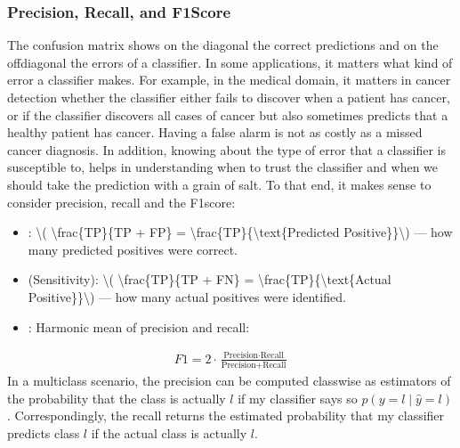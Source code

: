 \documentclass[letterpaper,10pt,english]{jupyterBook}
\begin{document}
\subsubsection{Precision, Recall, and F1\sphinxhyphen{}Score}
\label{\detokenize{classification_evaluation:precision-recall-and-f1-score}}
\sphinxAtStartPar
The confusion matrix shows on the diagonal the correct predictions and on the off\sphinxhyphen{}diagonal the errors of a classifier. In some applications, it matters what kind of error a classifier makes. For example, in the medical domain, it matters in cancer detection whether the classifier either fails to discover when a patient has cancer, or if the classifier discovers all cases of cancer but also sometimes predicts that a healthy patient has cancer. Having a false alarm is not as costly as a missed cancer diagnosis. In addition, knowing about the type of error that a classifier is susceptible to, helps in understanding when to trust the classifier and when we should take the prediction with a grain of salt. To that end, it makes sense to consider precision, recall and the F1\sphinxhyphen{}score:
\begin{itemize}
\item {} 
\sphinxAtStartPar
{}: \textbackslash{}( \textbackslash{}frac\{TP\}\{TP + FP\}  = \textbackslash{}frac\{TP\}\{\textbackslash{}text\{Predicted Positive\}\}\textbackslash{}) — how many predicted positives were correct.

\item {} 
\sphinxAtStartPar
{} (Sensitivity): \textbackslash{}( \textbackslash{}frac\{TP\}\{TP + FN\}  = \textbackslash{}frac\{TP\}\{\textbackslash{}text\{Actual Positive\}\}\textbackslash{}) — how many actual positives were identified.

\item {} 
\sphinxAtStartPar
{}: Harmonic mean of precision and recall:

\end{itemize}
\begin{equation*}
\begin{split}
F1 = 2 \cdot \frac{\text{Precision} \cdot \text{Recall}}{\text{Precision} + \text{Recall}}
\end{split}
\end{equation*}
\sphinxAtStartPar
In a multiclass scenario, the precision can be computed class\sphinxhyphen{}wise as estimators of the probability that the class is actually \(l\) if my classifier says so \(p(y=l\mid\hat{y}=l)\). Correspondingly, the recall returns the estimated probability that my classifier predicts class \(l\) if the actual class is actually \(l\).
\end{document}
